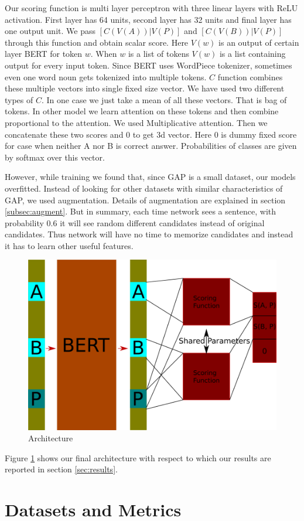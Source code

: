 \documentclass[11pt,a4paper]{article}
\begin{document}
Our scoring function is multi layer perceptron with three linear layers with ReLU activation. First layer has 64 units, second layer has 32 units and final layer has one output unit. We pass $[C(V(A))|V(P)]$ and $[C(V(B))|V(P)]$ through this function and obtain scalar score. Here $V(w)$ is an output of certain layer BERT for token $w$. When $w$ is a list of tokens $V(w)$ is a list containing output for every input token. Since BERT uses WordPiece tokenizer, sometimes even one word noun gets tokenized into multiple tokens. $C$ function combines these multiple vectors into single fixed size vector. We have used two different types of $C$. In one case we just take a mean of all these vectors. That is bag of tokens. In other model we learn attention on these tokens and then combine proportional to the attention. We used Multiplicative attention. Then we concatenate these two scores and $0$ to get 3d vector. Here $0$ is dummy fixed score for case when neither A nor B is correct answer. Probabilities of classes are given by softmax over this vector.

However, while training we found that, since GAP is a small dataset, our models overfitted. Instead of looking for other datasets with similar characteristics of GAP, we used augmentation. Details of augmentation are explained in section \ref{subsec:augment}. But in summary, each time network sees a sentence, with probability 0.6 it will see random different candidates instead of original candidates. Thus network will have no time to memorize candidates and instead it has to learn other useful features.



\begin{figure}
  \centering
  \includegraphics[width=.4\textwidth]{arch.png}
  \caption{Architecture}
  \label{fig:arch}
\end{figure}

Figure \ref{fig:arch} shows our final architecture with respect to which our results are reported in section \ref{sec:results}.
\section{Datasets and Metrics}
\end{document}
